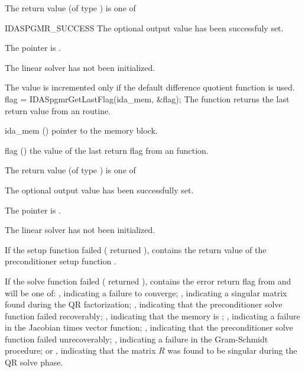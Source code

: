 {
  The return value  (of type ) is one of
  \begin{args}
  \item[IDASPGMR\_SUCCESS] 
    The optional output value has been successfuly set.
  \item[\Id{IDASPGMR\_MEM\_NULL}]
    The  pointer is .
  \item[\Id{IDASPGMR\_LMEM\_NULL}]
    The {\idaspgmr} linear solver has not been initialized.
  \end{args}
}
{
  The value  is incremented only if the default 
   difference quotient function is used.
}
{
  flag = IDASpgmrGetLastFlag(ida\_mem, \&flag);
}
{
  The function  returns the
  last return value from an {\idaspgmr} routine. 
}
{
  \begin{args}
  \item[ida\_mem] ()
    pointer to the {\ida} memory block.
  \item[flag] ()
    the value of the last return flag from an {\idaspgmr} function.
  \end{args}
}
{
  The return value  (of type ) is one of
  \begin{args}
  \item[\Id{IDASPGMR\_SUCCESS}] 
    The optional output value has been successfully set.
  \item[\Id{IDASPGMR\_MEM\_NULL}]
    The  pointer is .
  \item[\Id{IDASPGMR\_LMEM\_NULL}]
    The {\idaspgmr} linear solver has not been initialized.
  \end{args}
}
{
  If the {\idaspgmr} setup function failed ( 
  returned ),
   contains the return value of the preconditioner 
  setup function .

  If the {\idaspgmr} solve function failed ( returned 
  ),  contains the error return flag from
   and will be one of:
  , indicating a failure to converge;
  , indicating a singular matrix found during the
  QR factorization;
  , indicating that the preconditioner solve
  function  failed recoverably;
  , indicating that the {\spgmr} memory is ;
  , indicating a failure in the Jacobian times vector 
  function;
  , indicating that the preconditioner solve
  function  failed unrecoverably;
  , indicating a failure in the Gram-Schmidt procedure;
  or , indicating that the matrix $R$ was found to 
  be singular during the QR solve phase.
}
